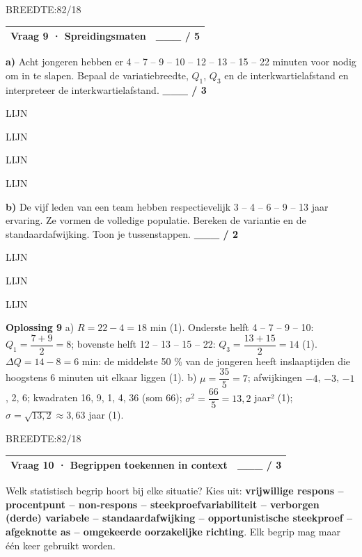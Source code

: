 \documentclass{article}
\newcommand{\lijn}{\par LIJN\par}
\newcommand{\breedtes}[1]{\par BREEDTE:#1\par}
\begin{document}
\breedtes{82/18}
\begin{tabular}{lc}
\hline
Vraag 9 · Spreidingsmaten & \_\_\_ / 5 \\
\hline
\end{tabular}

\textbf{a)} Acht jongeren hebben er 4 – 7 – 9 – 10 – 12 – 13 – 15 – 22 minuten voor nodig om in te slapen. Bepaal de variatiebreedte, $Q_1$, $Q_3$ en de interkwartielafstand en interpreteer de interkwartielafstand. \hfill \textbf{\_\_\_ / 3} \lijn \lijn \lijn \lijn 

\textbf{b)} De vijf leden van een team hebben respectievelijk 3 – 4 – 6 – 9 – 13 jaar ervaring. Ze vormen de volledige populatie. Bereken de variantie en de standaardafwijking. Toon je tussenstappen. \hfill \textbf{\_\_\_ / 2} \lijn \lijn \lijn 

\begin{oplossing}
\textbf{Oplossing 9} \quad a) $R=22-4=18$ min (1). Onderste helft 4 – 7 – 9 – 10: $Q_1=\dfrac{7+9}{2}=8$; bovenste helft 12 – 13 – 15 – 22: $Q_3=\dfrac{13+15}{2}=14$ (1). $\Delta Q=14-8=6$ min: de middelste 50 \% van de jongeren heeft inslaaptijden die hoogstens 6 minuten uit elkaar liggen (1). b) $\mu=\dfrac{35}{5}=7$; afwijkingen $-4$, $-3$, $-1$, 2, 6; kwadraten 16, 9, 1, 4, 36 (som 66); $\sigma^2=\dfrac{66}{5}=13{,}2$ jaar² (1); $\sigma=\sqrt{13{,}2}\approx 3{,}63$ jaar (1).
\end{oplossing}

\breedtes{82/18}
\begin{tabular}{lc}
\hline
Vraag 10 · Begrippen toekennen in context & \_\_\_ / 3 \\
\hline
\end{tabular}

Welk statistisch begrip hoort bij elke situatie? Kies uit: \textbf{vrijwillige respons – procentpunt – non-respons – steekproefvariabiliteit – verborgen (derde) variabele – standaardafwijking – opportunistische steekproef – afgeknotte as – omgekeerde oorzakelijke richting}. Elk begrip mag maar één keer gebruikt worden.
\end{document}
